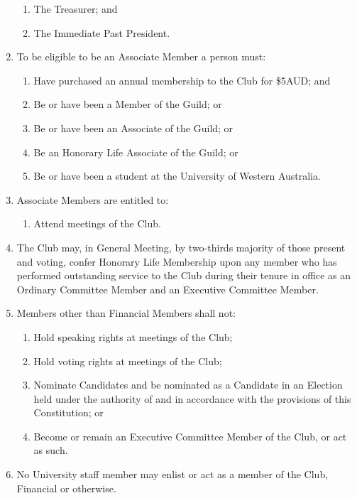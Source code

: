 \documentclass[12pt]{article}
\begin{document}
\begin{enumerate}[label=4.\arabic*]
\begin{enumerate}[label=\alph*.]
        \item The Treasurer; and
        \item The Immediate Past President.
    \end{enumerate}
    \item To be eligible to be an Associate Member a person must:
    \begin{enumerate}[label=\alph*.]
        \item Have purchased an annual membership to the Club for \$5AUD; and 
        \item Be or have been a Member of the Guild; or
        \item Be or have been an Associate of the Guild; or
        \item Be an Honorary Life Associate of the Guild; or
        \item Be or have been a student at the University of Western Australia.
    \end{enumerate}
    \item Associate Members are entitled to:
    \begin{enumerate}[label=\alph*.]
        \item Attend meetings of the Club.
    \end{enumerate}
    \item The Club may, in General Meeting, by two-thirds majority of those present and voting, confer Honorary Life Membership upon any member who has performed outstanding service to the Club during their tenure in office as an Ordinary Committee Member and an Executive Committee Member.
    \item Members other than Financial Members shall not:
    \begin{enumerate}[label=\alph*.]
        \item Hold speaking rights at meetings of the Club;
        \item Hold voting rights at meetings of the Club;
        \item Nominate Candidates and be nominated as a Candidate in an Election held under the authority of and in accordance with the provisions of this Constitution; or
        \item Become or remain an Executive Committee Member of the Club, or act as such.
    \end{enumerate}
    \item No University staff member may enlist or act as a member of the Club, Financial or otherwise.
\end{enumerate}
\end{document}
